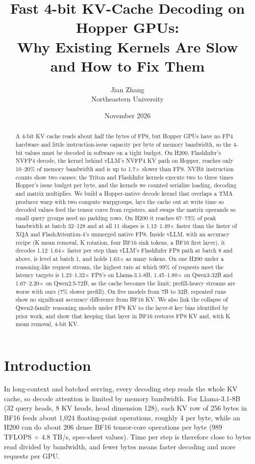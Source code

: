 \documentclass[11pt]{article}
\title{Fast 4-bit KV-Cache Decoding on Hopper GPUs:\\
Why Existing Kernels Are Slow and How to Fix Them}
\author{Jian Zhang\\ Northeastern University}
\date{November 2026}
\begin{document}
\maketitle

\begin{abstract}
A 4-bit KV cache reads about half the bytes of FP8, but Hopper GPUs have no FP4 hardware and little instruction-issue capacity per byte of memory bandwidth, so the 4-bit values must be decoded in software on a tight budget. On H200, FlashInfer's NVFP4 decode, the kernel behind vLLM's NVFP4 KV path on Hopper, reaches only 10--20\% of memory bandwidth and is up to 1.7$\times$ slower than FP8. NVBit instruction counts show two causes: the Triton and FlashInfer kernels execute two to three times Hopper's issue budget per byte, and the kernels we counted serialize loading, decoding and matrix multiplies. We build a Hopper-native decode kernel that overlaps a TMA producer warp with two compute warpgroups, lays the cache out at write time so decoded values feed the tensor cores from registers, and swaps the matrix operands so small query groups need no padding rows. On H200 it reaches 67--75\% of peak bandwidth at batch 32--128 and at all 11 shapes is 1.12--1.49$\times$ faster than the faster of XQA and FlashAttention-4's unmerged native FP8. Inside vLLM, with an accuracy recipe (K mean removal, K rotation, four BF16 sink tokens, a BF16 first layer), it decodes 1.12--1.64$\times$ faster per step than vLLM's FlashInfer FP8 path at batch 8 and above, is level at batch 1, and holds 1.63$\times$ as many tokens. On one H200 under a reasoning-like request stream, the highest rate at which 99\% of requests meet the latency targets is 1.23--1.32$\times$ FP8's on Llama-3.1-8B, 1.45--1.80$\times$ on Qwen3-32B and 1.67--2.20$\times$ on Qwen2.5-72B, as the cache becomes the limit; prefill-heavy streams are worse with ours (7\% slower prefill). On five models from 7B to 32B, repeated runs show no significant accuracy difference from BF16 KV. We also link the collapse of Qwen2-family reasoning models under FP8 KV to the layer-0 key bias identified by prior work, and show that keeping that layer in BF16 restores FP8 KV and, with K mean removal, 4-bit KV.
\end{abstract}

\section{Introduction}
\label{sec:intro}

In long-context and batched serving, every decoding step reads the whole KV cache, so decode attention is limited by memory bandwidth. For Llama-3.1-8B (32 query heads, 8 KV heads, head dimension 128), each KV row of 256 bytes in BF16 feeds about 1,024 floating-point operations, roughly 4 per byte, while an H200 can do about 206 dense BF16 tensor-core operations per byte (989 TFLOPS $\div$ 4.8 TB/s, spec-sheet values). Time per step is therefore close to bytes read divided by bandwidth, and fewer bytes means faster decoding and more requests per GPU.
\end{document}

